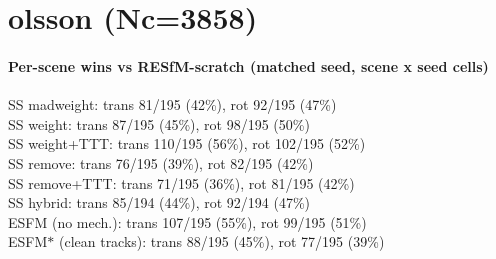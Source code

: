 \documentclass[10pt]{article}
\begin{document}
\section*{olsson  (Nc=3858)}
\begin{center}\end{center}
\paragraph{Per-scene wins vs RESfM-scratch (matched seed, scene x seed cells)}
\indent SS madweight: trans 81/195 (42\%), rot 92/195 (47\%)\\
\indent SS weight: trans 87/195 (45\%), rot 98/195 (50\%)\\
\indent SS weight+TTT: trans 110/195 (56\%), rot 102/195 (52\%)\\
\indent SS remove: trans 76/195 (39\%), rot 82/195 (42\%)\\
\indent SS remove+TTT: trans 71/195 (36\%), rot 81/195 (42\%)\\
\indent SS hybrid: trans 85/194 (44\%), rot 92/194 (47\%)\\
\indent ESFM (no mech.): trans 107/195 (55\%), rot 99/195 (51\%)\\
\indent ESFM$\ast$ (clean tracks): trans 88/195 (45\%), rot 77/195 (39\%)\\
\end{document}
